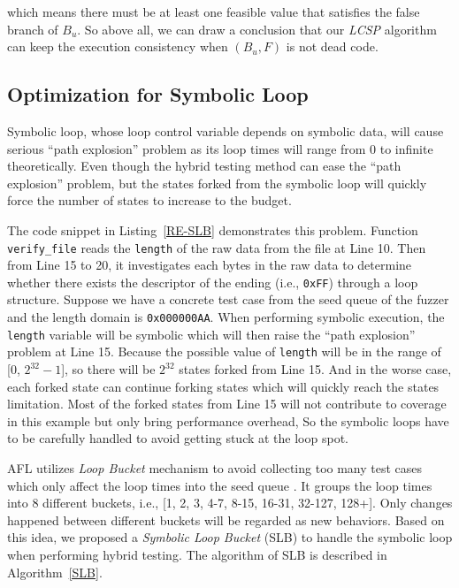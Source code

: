 \noindent which means there must be at least one feasible value that satisfies the false branch of $B_u$. So above all, we can draw a conclusion that our \emph{LCSP} algorithm can keep the execution consistency when $(B_u, F)$ is not dead code.

\subsection{Optimization for Symbolic Loop}
Symbolic loop, whose loop control variable depends on symbolic data, will cause serious ``path explosion'' problem as its loop times will range from 0 to infinite theoretically. 
Even though the hybrid testing method can ease the ``path explosion'' problem, but the states forked from the symbolic loop will quickly force the number of states to increase to the budget. 

 

The code snippet in Listing~\ref{RE-SLB} demonstrates this problem. Function \texttt{verify\_file} reads the \texttt{length} of the raw data from the file at Line 10. Then from Line 15 to 20, it investigates each bytes in the raw data to determine whether there exists the descriptor of the ending (i.e., \texttt{0xFF}) through a loop structure. Suppose we have a concrete test case from the seed queue of the fuzzer and the length domain is \texttt{0x000000AA}. 
When performing symbolic execution, the \texttt{length} variable will be symbolic which will then raise the ``path explosion'' problem at Line 15. Because the possible value of \texttt{length} will be in the range of [0, $2^{32}-1$], so there will be $2^{32}$ states forked from Line 15. And in the worse case, each forked state can continue forking states which will quickly reach the states limitation. 
Most of the forked states from Line 15 will not contribute to coverage in this example but only bring performance overhead, So the symbolic loops have to be carefully handled to avoid getting stuck at the loop spot. 

AFL utilizes \emph{Loop Bucket} mechanism to avoid collecting too many test cases which only affect the loop times into the seed queue \cite{online:afl}. It groups the loop times into 8 different buckets, i.e., [1, 2, 3, 4-7, 8-15, 16-31, 32-127, 128+]. Only changes happened between different buckets will be regarded as new behaviors. Based on this idea, we proposed a \textit{Symbolic Loop Bucket} (SLB) to handle the symbolic loop when performing hybrid testing. The algorithm of SLB is described in Algorithm~\ref{SLB}.

